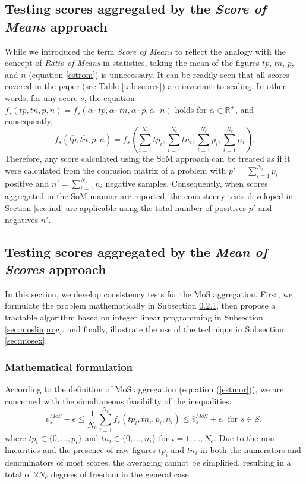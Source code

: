 \documentclass[3p, times]{elsarticle}
\begin{document}
\subsection{Testing scores aggregated by the \emph{Score of Means} approach}
\label{sec:rom}

While we introduced the term \emph{Score of Means} to reflect the analogy with the concept of \emph{Ratio of Means} in statistics, taking the mean of the figures $tp$, $tn$, $p$, and $n$ (equation \ref{estrom}) is unnecessary. It can be readily seen that all scores covered in the paper (see Table \ref{tab:scores}) are invariant to scaling. In other words, for any score $s$, the equation $f_s(tp, tn, p, n) = f_s(\alpha\cdot tp, \alpha\cdot tn, \alpha\cdot p, \alpha\cdot n)$ holds for $\alpha \in\mathbb{R}^{+}$, and consequently,
\begin{equation}
f_s(\overline{tp}, \overline{tn}, \overline{p}, \overline{n}) = f_s\left(\sum\limits_{i=1}^{N_e} tp_i, \sum\limits_{i=1}^{N_e} tn_i, \sum\limits_{i=1}^{N_e} p_i, \sum\limits_{i=1}^{N_e} n_i\right).
\end{equation}
Therefore, any score calculated using the SoM approach can be treated as if it were calculated from the confusion matrix of a problem with $p'=\sum\limits_{i=1}^{N_e} p_i$ positive and $n'=\sum\limits_{i=1}^{N_e} n_i$ negative samples. Consequently, when scores aggregated in the SoM manner are reported, the consistency tests developed in Section \ref{sec:ind} are applicable using the total number of positives $p'$ and negatives $n'$.

\subsection{Testing scores aggregated by the \emph{Mean of Scores} approach}
\label{sec:mor}

In this section, we develop consistency tests for the MoS aggregation. First, we formulate the problem mathematically in Subsection \ref{sec:mosmath}, then propose a tractable algorithm based on integer linear programming in Subsection \ref{sec:moslinprog}, and finally, illustrate the use of the technique in Subsection \ref{sec:mosex}.

\subsubsection{Mathematical formulation}
\label{sec:mosmath}
According to the definition of MoS aggregation (equation (\ref{estmor})), we are concerned with the simultaneous feasibility of the inequalities:
\begin{equation}
\label{nlopt}
\hat{v}_s^{MoS} - \epsilon \leq \dfrac{1}{N_e}\sum\limits_{i=1}^{N_e} f_s(tp_i, tn_i, p_i, n_i) \leq \hat{v}_s^{MoS} + \epsilon, \; \text{for } s \in \mathcal{S},
\end{equation}
where $tp_i \in \lbrace 0, \dots, p_i\rbrace$ and $tn_i \in \lbrace 0, \dots, n_i\rbrace$ for $i = 1, \dots, N_e$. Due to the non-linearities and the presence of raw figures $tp_i$ and $tn_i$ in both the numerators and denominators of most scores, the averaging cannot be simplified, resulting in a total of $2N_e$ degrees of freedom in the general case.
\end{document}
